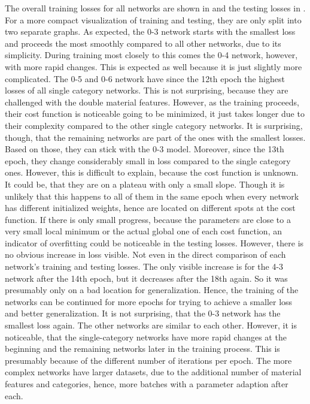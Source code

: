 The overall training losses for all networks are shown in  and the testing losses in .
For a more compact visualization of training and testing, they are only split into two separate graphs.
As expected, the 0-3 network starts with the smallest loss and proceeds the most smoothly compared to all other networks, due to its simplicity.
During training most closely to this comes the 0-4 network, however, with more rapid changes.
This is expected as well because it is just slightly more complicated.
The 0-5 and 0-6 network have since the 12th epoch the highest losses of all single category networks.
This is not surprising, because they are challenged with the double material features.
However, as the training proceeds, their cost function is noticeable going to be minimized, it just takes longer due to their complexity compared to the other single category networks.
It is surprising, though, that the remaining networks are part of the ones with the smallest losses.
Based on those, they can stick with the 0-3 model.
Moreover, since the 13th epoch, they change considerably small in loss compared to the single category ones.
However, this is difficult to explain, because the cost function is unknown.
It could be, that they are on a plateau with only a small slope.
Though it is unlikely that this happens to all of them in the same epoch when every network has different initialized weights, hence are located on different spots at the cost function.
If there is only small progress, because the parameters are close to a very small local minimum or the actual global one of each cost function, an indicator of overfitting could be noticeable in the testing losses.
However, there is no obvious increase in loss visible.
Not even in the direct comparison of each network's training and testing losses.
The only visible increase is for the 4-3 network after the 14th epoch, but it decreases after the 18th again.
So it was presumably only on a bad location for generalization.
Hence, the training of the networks can be continued for more epochs for trying to achieve a smaller loss and better generalization.
It is not surprising, that the 0-3 network has the smallest loss again.
The other networks are similar to each other.
However, it is noticeable, that the single-category networks have more rapid changes at the beginning and the remaining networks later in the training process.
This is presumably because of the different number of iterations per epoch.
The more complex networks have larger datasets, due to the additional number of material features and categories, hence, more batches with a parameter adaption after each.
